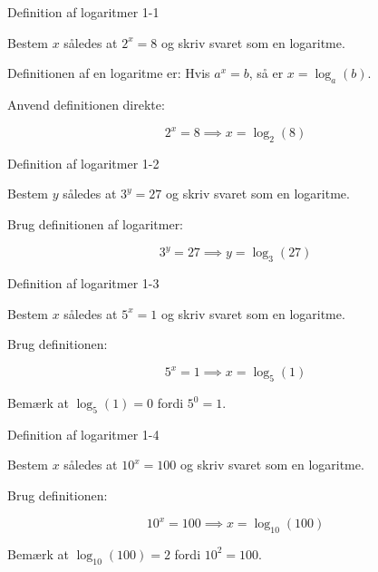 \documentclass{article}
\begin{document}

\tableofcontents
\newpage

\begin{exercise}{Definition af logaritmer 1-1}

Bestem $x$ således at $2^x = 8$ og skriv svaret som en logaritme.


\hint

Definitionen af en logaritme er: Hvis $a^x = b$, så er $x = \log_a(b)$.

\hint

Anvend definitionen direkte:

\hint
\[
2^x = 8 \implies x = \log_2(8)
\]

\end{exercise}

\newpage

\begin{exercise}{Definition af logaritmer 1-2}

Bestem $y$ således at $3^y = 27$ og skriv svaret som en logaritme.


\hint

Brug definitionen af logaritmer:

\hint
\[
3^y = 27 \implies y = \log_3(27)
\]

\end{exercise}

\newpage

\begin{exercise}{Definition af logaritmer 1-3}

Bestem $x$ således at $5^x = 1$ og skriv svaret som en logaritme.


\hint

Brug definitionen:

\hint
\[
5^x = 1 \implies x = \log_5(1)
\]

\hint

Bemærk at $\log_5(1) = 0$ fordi $5^0 = 1$.

\end{exercise}

\newpage

\begin{exercise}{Definition af logaritmer 1-4}

Bestem $x$ således at $10^x = 100$ og skriv svaret som en logaritme.


\hint

Brug definitionen:

\hint
\[
10^x = 100 \implies x = \log_{10}(100)
\]

\hint

Bemærk at $\log_{10}(100) = 2$ fordi $10^2 = 100$.

\end{exercise}
\end{document}
